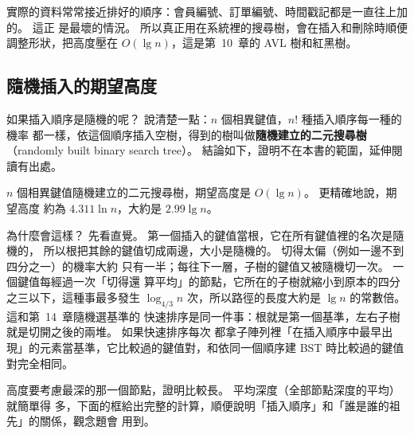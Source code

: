實際的資料常常接近排好的順序：會員編號、訂單編號、時間戳記都是一直往上加的。 這正
是最壞的情況。 所以真正用在系統裡的搜尋樹，會在插入和刪除時順便調整形狀，把高度壓在
$O(\lg n)$，這是第~10~章的 AVL 樹和紅黑樹。

\subsection{隨機插入的期望高度}

如果插入順序是隨機的呢？ 說清楚一點：$n$ 個相異鍵值，$n!$ 種插入順序每一種的機率
都一樣，依這個順序插入空樹，得到的樹叫做\textbf{隨機建立的二元搜尋樹}（randomly
built binary search tree）。 結論如下，證明不在本書的範圍，延伸閱讀有出處。

\begin{theorem}
\label{thm:bst-random-height}
$n$ 個相異鍵值隨機建立的二元搜尋樹，期望高度是 $O(\lg n)$。 更精確地說，期望高度
約為 $4.311 \ln n$，大約是 $2.99 \lg n$。
\end{theorem}

為什麼會這樣？ 先看直覺。 第一個插入的鍵值當根，它在所有鍵值裡的名次是隨機的，
所以根把其餘的鍵值切成兩邊，大小是隨機的。 切得太偏（例如一邊不到四分之一）的機率大約
只有一半；每往下一層，子樹的鍵值又被隨機切一次。 一個鍵值每經過一次「切得還
算平均」的節點，它所在的子樹就縮小到原本的四分之三以下，這種事最多發生
$\log_{4/3} n$ 次，所以路徑的長度大約是 $\lg n$ 的常數倍。 這和第~14~章隨機選基準的
快速排序是同一件事：根就是第一個基準，左右子樹就是切開之後的兩堆。 如果快速排序每次
都拿子陣列裡「在插入順序中最早出現」的元素當基準，它比較過的鍵值對，和依同一個順序建
BST 時比較過的鍵值對完全相同。

高度要考慮最深的那一個節點，證明比較長。 平均深度（全部節點深度的平均）就簡單得
多，下面的框給出完整的計算，順便說明「插入順序」和「誰是誰的祖先」的關係，觀念題會
用到。

